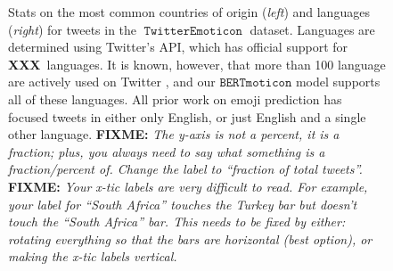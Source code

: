 \documentclass[11pt]{article}
\newcommand{\fixme}[1]{{\color{red} \textbf{FIXME:} {\textit {#1}}}}
\newcommand{\XXX}{{\textbf{XXX}}~}
\newcommand{\bertmoji}{\texttt{BERTmoticon}}
\DeclareMathOperator{\emoticon}{\texttt{TwitterEmoticon}}
\begin{document}
\begin{figure}%
    \centering
    \label{adsad}
    \caption{ 
        Stats on the most common countries of origin (\emph{left}) and languages (\emph{right}) for tweets in the $\emoticon$ dataset.
        Languages are determined using Twitter's API, which has official support for \XXX languages.
        It is known, however, that more than 100 language are actively used on Twitter \citep{fixme},
        and our $\bertmoji$ model supports all of these languages.
        All prior work on emoji prediction has focused tweets in either only English,
        or just English and a single other language.
        \fixme{
            The y-axis is not a percent, it is a fraction;
            plus, you always need to say what something is a fraction/percent of.
            Change the label to ``fraction of total tweets''.
        }
        \fixme{
            Your x-tic labels are very difficult to read.
            For example, your label for ``South Africa'' touches the Turkey bar but doesn't touch the ``South Africa'' bar.
            This needs to be fixed by either: rotating everything so that the bars are horizontal (best option),
            or making the x-tic labels vertical.
        }
    }%
    \label{fig:stats:countrylang}%
\end{figure}
\end{document}
